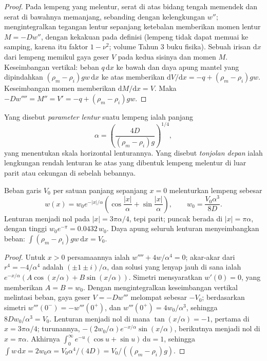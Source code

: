 \begin{proof}
Pada lempeng yang melentur, serat di atas bidang tengah memendek dan serat di bawahnya
memanjang, sebanding dengan kelengkungan $w''$; mengintegralkan tegangan lentur
sepanjang ketebalan memberikan momen lentur $M = -Dw''$, dengan
kekakuan pada definisi (lempeng tidak dapat memuai ke samping, karena itu faktor
$1 - \nu^2$; volume Tahun 3 buku fisika). Sebuah irisan $\mathrm dx$ dari lempeng
memikul gaya geser $V$ pada kedua sisinya dan momen $M$. Keseimbangan vertikal:
beban $q\,\mathrm dx$ ke bawah dan daya apung mantel yang dipindahkan
$(\rho_m - \rho_i)gw\,\mathrm dx$ ke atas memberikan $\mathrm dV/\mathrm dx = -q +
(\rho_m - \rho_i)gw$. Keseimbangan momen memberikan $\mathrm dM/\mathrm dx = V$.
Maka $-Dw'''' = M'' = V' = -q + (\rho_m - \rho_i)gw$.
\end{proof}

\begin{definition}\label{def:b3:gravity-geodesy:alpha}
Yang disebut \emph{parameter lentur} suatu lempeng ialah
panjang
\[
  \alpha = \left(\frac{4D}{(\rho_m - \rho_i)g}\right)^{1/4},
\]
yang menentukan skala horizontal lenturannya. Yang disebut \emph{tonjolan depan}
ialah lengkungan rendah lenturan ke atas yang dibentuk lempeng melentur di luar parit atau
cekungan di sebelah bebannya.
\end{definition}

\begin{proposition}\label{prop:b3:gravity-geodesy:line}
Beban garis $V_0$ per satuan panjang sepanjang $x = 0$ melenturkan lempeng sebesar
\[
  w(x) = w_0e^{-|x|/\alpha}\left(\cos\frac{|x|}{\alpha} + \sin\frac{|x|}{\alpha}\right),
  \qquad w_0 = \frac{V_0\alpha^3}{8D} .
\]
Lenturan menjadi nol pada $|x| = 3\pi\alpha/4$, tepi parit; puncak 
berada di $|x| = \pi\alpha$, dengan tinggi $w_0e^{-\pi} =
\num{0.0432}\,w_0$. Daya apung seluruh lenturan menyeimbangkan beban:
$\int(\rho_m - \rho_i)gw\,\mathrm dx = V_0$.
\end{proposition}

\begin{proof}
Untuk $x > 0$ persamaannya ialah $w'''' + 4w/\alpha^4 = 0$; akar-akar dari
$r^4 = -4/\alpha^4$ adalah $(\pm1 \pm i)/\alpha$, dan solusi yang lenyap jauh
di sana ialah $e^{-x/\alpha}(A\cos(x/\alpha) + B\sin(x/\alpha))$. Simetri mensyaratkan
$w'(0) = 0$, yang memberikan $A = B = w_0$. Dengan mengintegralkan keseimbangan vertikal melintasi
beban, gaya geser $V = -Dw'''$ melompat sebesar $-V_0$; berdasarkan simetri
$w'''(0^-) = -w'''(0^+)$, dan $w'''(0^+) = 4w_0/\alpha^3$, sehingga $8Dw_0/\alpha^3 =
V_0$. Lenturan menjadi nol di mana $\tan(x/\alpha) =
-1$, pertama di $x = 3\pi\alpha/4$; turunannya,
$-(2w_0/\alpha)e^{-x/\alpha}\sin(x/\alpha)$, berikutnya menjadi nol di $x = \pi\alpha$.
Akhirnya $\int_0^\infty e^{-u}(\cos u + \sin u)\,\mathrm du = 1$, sehingga
$\int w\,\mathrm dx = 2w_0\alpha = V_0\alpha^4/(4D) = V_0/((\rho_m - \rho_i)g)$.
\end{proof}

